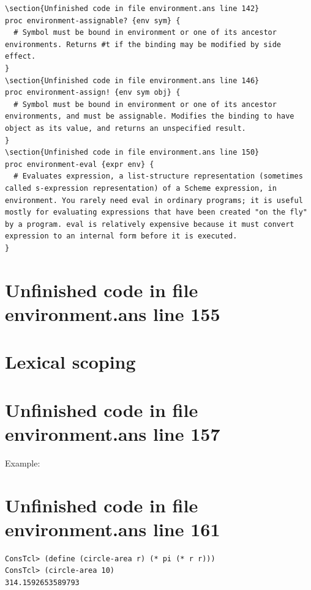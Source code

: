 \documentclass[twoside,9pt]{report}
\begin{document}
\begin{lstlisting}
\section{Unfinished code in file environment.ans line 142}
proc environment-assignable? {env sym} {
  # Symbol must be bound in environment or one of its ancestor environments. Returns #t if the binding may be modified by side effect.
}
\section{Unfinished code in file environment.ans line 146}
proc environment-assign! {env sym obj} {
  # Symbol must be bound in environment or one of its ancestor environments, and must be assignable. Modifies the binding to have object as its value, and returns an unspecified result.
}
\section{Unfinished code in file environment.ans line 150}
proc environment-eval {expr env} {
  # Evaluates expression, a list-structure representation (sometimes called s-expression representation) of a Scheme expression, in environment. You rarely need eval in ordinary programs; it is useful mostly for evaluating expressions that have been created "on the fly" by a program. eval is relatively expensive because it must convert expression to an internal form before it is executed.
}
\end{lstlisting}
\section{Unfinished code in file environment.ans line 155}
\section{Lexical scoping}
\label{lexical-scoping}
\section{Unfinished code in file environment.ans line 157}


Example:

\section{Unfinished code in file environment.ans line 161}
\begin{verbatim}
ConsTcl> (define (circle-area r) (* pi (* r r)))
ConsTcl> (circle-area 10)
314.1592653589793
\end{verbatim}
\end{document}
